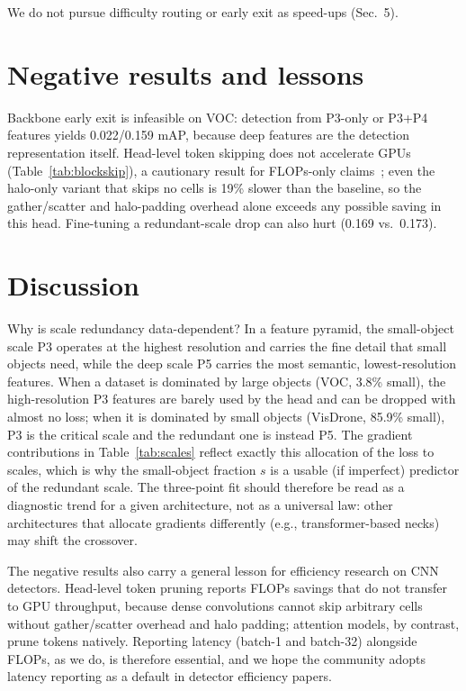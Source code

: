 \documentclass[a4paper,fleqn]{cas-dc}
\begin{document}
We do not pursue difficulty routing or early exit as speed-ups (Sec.~5).

\section{Negative results and lessons}
Backbone early exit is infeasible on VOC: detection from P3-only or P3+P4 features yields 0.022/0.159 mAP, because deep features are the detection representation itself. Head-level token skipping does not accelerate GPUs (Table~\ref{tab:blockskip}), a cautionary result for FLOPs-only claims~\cite{rao2021dynamicvit,liang2022evit}; even the halo-only variant that skips no cells is 19\% slower than the baseline, so the gather/scatter and halo-padding overhead alone exceeds any possible saving in this head. Fine-tuning a redundant-scale drop can also hurt (0.169 vs.\ 0.173).

\section{Discussion}
Why is scale redundancy data-dependent? In a feature pyramid, the small-object scale P3 operates at the highest resolution and carries the fine detail that small objects need, while the deep scale P5 carries the most semantic, lowest-resolution features. When a dataset is dominated by large objects (VOC, 3.8\% small), the high-resolution P3 features are barely used by the head and can be dropped with almost no loss; when it is dominated by small objects (VisDrone, 85.9\% small), P3 is the critical scale and the redundant one is instead P5. The gradient contributions in Table~\ref{tab:scales} reflect exactly this allocation of the loss to scales, which is why the small-object fraction $s$ is a usable (if imperfect) predictor of the redundant scale. The three-point fit should therefore be read as a diagnostic trend for a given architecture, not as a universal law: other architectures that allocate gradients differently (e.g., transformer-based necks) may shift the crossover.

The negative results also carry a general lesson for efficiency research on CNN detectors. Head-level token pruning reports FLOPs savings that do not transfer to GPU throughput, because dense convolutions cannot skip arbitrary cells without gather/scatter overhead and halo padding; attention models, by contrast, prune tokens natively. Reporting latency (batch-1 and batch-32) alongside FLOPs, as we do, is therefore essential, and we hope the community adopts latency reporting as a default in detector efficiency papers.
\end{document}
